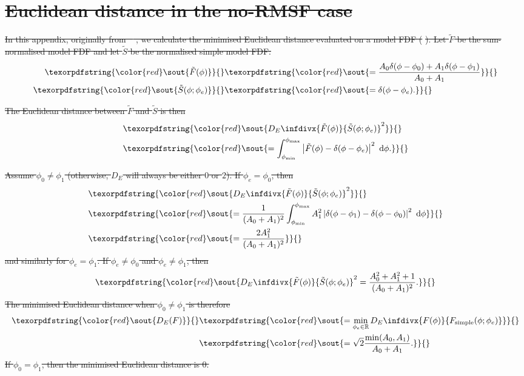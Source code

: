 \documentclass[11pt, a4paper]{book}
\providecommand{\DIFdeltex}[1]{{\protect\color{red}\sout{#1}}}                      %
\providecommand{\DIFdel}[1]{\texorpdfstring{\DIFdeltex{#1}}{}} %
\begin{document}
\section{\DIFdel{Euclidean distance in the no-RMSF case}}
\addtocounter{section}{-1}%

\DIFdel{In this appendix, originally from \mbox{%
\citet{alger2021interpretable}}\hspace{0pt}%
, we calculate the minimised Euclidean distance evaluated on a model FDF (}%
\DIFdel{). Let $\tilde F$ be the sum-normalised model FDF and let $\tilde S$ be the normalised simple model FDF:
  }\begin{align*}
    \DIFdel{\tilde F(\phi) }&\DIFdel{= \frac{A_0 \delta(\phi - \phi_0) + A_1 \delta(\phi - \phi_1)}{A_0 + A_1}}\\
    \DIFdel{\tilde S(\phi; \phi_e) }&\DIFdel{= \delta(\phi - \phi_e).
  }\end{align*}%

\DIFdel{The Euclidean distance between $\tilde F$ and $\tilde S$ is then
  }\begin{align*}
    &\DIFdel{D_E\infdivx{\tilde F(\phi)}{\tilde S(\phi; \phi_e)}^2}\\
    &\DIFdel{= \int_{\phi_{\min}}^{\phi_{\max}} \left|\tilde F(\phi) - \delta(\phi - \phi_e) \right|^2\ \mathrm{d}\phi.
  }\end{align*}%

\DIFdel{Assume $\phi_0 \neq \phi_1$ (otherwise, $D_E$ will always be either $0$ or $2$). If $\phi_e = \phi_0$, then
  }\begin{align*}
    &\DIFdel{D_E\infdivx{\tilde F(\phi)}{\tilde S(\phi; \phi_e)}^2}\\
      &\DIFdel{= \frac{1}{(A_0 + A_1)^2} \int_{\phi_{\min}}^{\phi_{\max}} A_1^2 \left|\delta(\phi - \phi_1) - \delta(\phi - \phi_0) \right|^2\ \mathrm{d}\phi}\\
      &\DIFdel{= \frac{2 A_1^2}{(A_0 + A_1)^2}
  }\end{align*}%
\DIFdel{and similarly for $\phi_e = \phi_1$. If $\phi_e \neq \phi_0$ and $\phi_e \neq \phi_1$, then
  }\begin{displaymath}
    \DIFdel{D_E\infdivx{\tilde F(\phi)}{\tilde S(\phi; \phi_e)}^2 = \frac{A_0^2 + A_1^2 + 1}{(A_0 + A_1)^2}.
  }\end{displaymath}%
\DIFdel{The minimised Euclidean distance when $\phi_0 \neq \phi_1$ is therefore
  }\begin{align*}
      \DIFdel{D_E(F) }&\DIFdel{= \min_{\phi_e \in \mathbb{R}} D_E\infdivx{F(\phi)}{F_{\mathrm{simple}}(\phi; \phi_e)}}\\
          &\DIFdel{= \sqrt{2} \frac{\min(A_0, A_1)}{A_0 + A_1}.
  }\end{align*}%
\DIFdel{If $\phi_0 = \phi_1$, then the minimised Euclidean distance is 0.
}%
\end{document}
